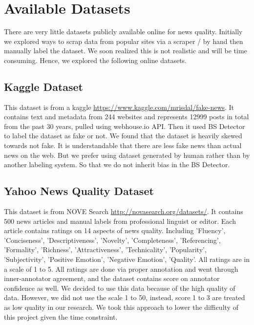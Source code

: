 \documentclass[11pt]{article}
\begin{document}
\section{Available Datasets}

There are very little datasets publicly available online for news quality. Initially we explored ways to scrap data from popular sites via a scraper / by hand then manually label the dataset. We soon realized this is not realistic and will be time consuming. Hence, we explored the following online datasets.

\subsection{Kaggle Dataset}

This dataset is from a kaggle \url{https://www.kaggle.com/mrisdal/fake-news}. It contains text and metadata from 244 websites and represents 12999 posts in total from the past 30 years, pulled using webhouse.io API. Then it used BS Detector to label the dataset as fake or not. We found that the dataset is heavily skewed towards not fake. It is understandable that there are less fake news than actual news on the web. But we prefer using dataset generated by human rather than by another labeling system. So that we do not inherit bias in the BS Detector.  

\subsection{Yahoo News Quality Dataset}

This dataset is from NOVE Search \url{http://novasearch.org/datasets/}. It contains 500 news articles and manual labels from professional linguist or editor. Each article contains ratings on 14 aspects of news quality. Including 'Fluency', 'Conciseness', 'Descriptiveness', 'Novelty', 'Completeness', 'Referencing', 'Formality', 'Richness', 'Attractiveness', 'Technicality', 'Popularity', 'Subjectivity', 'Positive Emotion', 'Negative Emotion', 'Quality'. All ratings are in a scale of 1 to 5. All ratings are done via proper annotation and went through inner-annotator agreement, and the dataset contains score on annotator confidence as well. We decided to use this data because of the high quality of data. However, we did not use the scale 1 to 50, instead, score 1 to 3 are treated as low quality in our research. We took this approach to lower the difficulty of this project given the time constraint. 
\end{document}
